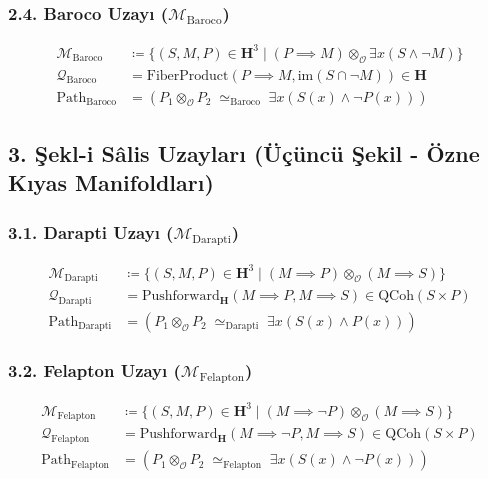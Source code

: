 \documentclass[11pt, a4paper]{article}
\begin{document}
\subsubsection{2.4. Baroco Uzayı ($\mathcal{M}_{\text{Baroco}}$)}
\begin{align}
\mathcal{M}_{\text{Baroco}} &\coloneqq \{ (S, M, P) \in \mathbf{H}^3 \mid (P \implies M) \otimes_{\mathcal{O}} \exists x (S \land \neg M) \} \\
\mathcal{Q}_{\text{Baroco}} &= \text{FiberProduct}(P \implies M, \text{im}(S \cap \neg M)) \in \mathbf{H} \\
\text{Path}_{\text{Baroco}} &= (P_1 \otimes_{\mathcal{O}} P_2 \;\simeq_{\text{Baroco}}\; \exists x (S(x) \land \neg P(x)))
\end{align}

\subsection{3. Şekl-i Sâlis Uzayları (Üçüncü Şekil - Özne Kıyas Manifoldları)}

\subsubsection{3.1. Darapti Uzayı ($\mathcal{M}_{\text{Darapti}}$)}
\begin{align}
\mathcal{M}_{\text{Darapti}} &\coloneqq \{ (S, M, P) \in \mathbf{H}^3 \mid (M \implies P) \otimes_{\mathcal{O}} (M \implies S) \} \\
\mathcal{Q}_{\text{Darapti}} &= \text{Pushforward}_{\mathbf{H}}(M \implies P, M \implies S) \in \text{QCoh}(S \times P) \\
\text{Path}_{\text{Darapti}} &= (P_1 \otimes_{\mathcal{O}} P_2 \;\simeq_{\text{Darapti}}\; \exists x (S(x) \land P(x)))
\end{align}

\subsubsection{3.2. Felapton Uzayı ($\mathcal{M}_{\text{Felapton}}$)}
\begin{align}
\mathcal{M}_{\text{Felapton}} &\coloneqq \{ (S, M, P) \in \mathbf{H}^3 \mid (M \implies \neg P) \otimes_{\mathcal{O}} (M \implies S) \} \\
\mathcal{Q}_{\text{Felapton}} &= \text{Pushforward}_{\mathbf{H}}(M \implies \neg P, M \implies S) \in \text{QCoh}(S \times P) \\
\text{Path}_{\text{Felapton}} &= (P_1 \otimes_{\mathcal{O}} P_2 \;\simeq_{\text{Felapton}}\; \exists x (S(x) \land \neg P(x)))
\end{align}
\end{document}
